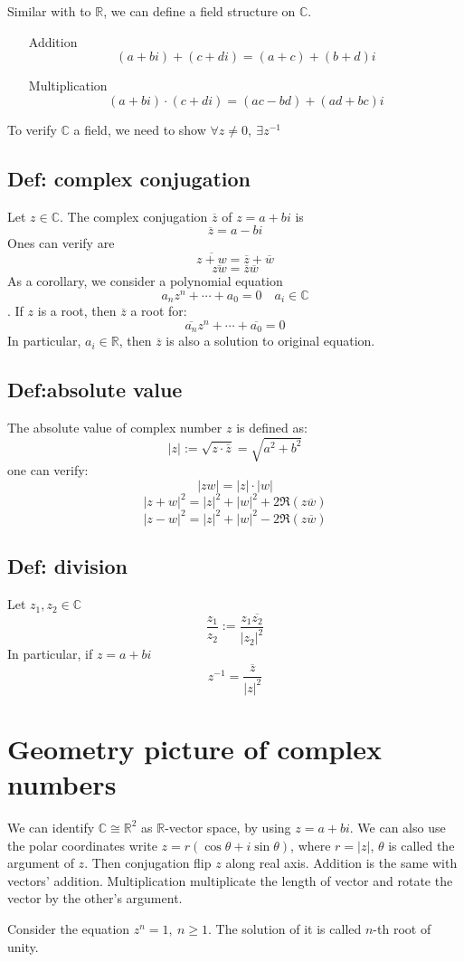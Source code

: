 \documentclass{book}
\newcommand{\abs}[1]{\left\lvert #1 \right\rvert}
\begin{document}
Similar with to $\mathbb R$, we can define a field structure on $\mathbb C$.\begin{itemize}
    \item[Addition]$$(a+bi)+(c+di)=(a+c)+(b+d)i$$
    \item[Multiplication]$$(a+bi)\cdot(c+di)=(ac-bd)+(ad+bc)i$$ 
\end{itemize}
To verify $\mathbb C$ a field, we need to show $\forall z\neq 0,\ \exists z^{-1}$
\section{Def: complex conjugation}Let $z\in \mathbb C$. The complex conjugation $\overline z$ of $z=a+bi$ is
$$\overline z=a-bi$$
Ones can verify are $$\overline{z+w}=\overline z+\overline w$$
$$\overline{zw}=\overline{z}\overline{w}$$
As a corollary, we consider a polynomial equation
$$a_nz^n+\cdots+a_0=0\quad a_i\in \mathbb{C}$$. If $z$ is a root, then $\overline z$ a root for:
$$\overline{a_n}z^n+\cdots+\overline{a_0}=0$$
In particular, $a_i\in\mathbb R$, then $\overline z$ is also a solution to original equation.
\section{Def:absolute value}
The absolute value of complex number $z$ is defined as:
$$\abs{z}:=\sqrt{z\cdot\overline z}=\sqrt{a^2+b^2}$$ one can verify:
$$\abs{zw}=\abs z\cdot\abs w$$
$$\abs{z+w}^2=\abs{z}^2+\abs{w}^2+2\Re(z\overline w)$$
$$\abs{z-w}^2=\abs{z}^2+\abs{w}^2-2\Re(z\overline w)$$
\section{Def: division}
Let $z_1,z_2\in \mathbb C$
$$\frac{z_1}{z_2}:=\frac{z_1\overline {z_2}}{\abs{z_2}^2}$$
In particular, if $z=a+bi$$$z^{-1}=\frac{\overline z}{\abs{z}^2}$$
\chapter{Geometry picture of complex numbers}
We can identify $\mathbb C\cong \mathbb R^2$ as $\mathbb R$-vector space, by using $z=a+bi$. We can also use the polar coordinates write $z=r(\cos\theta+i\sin\theta)$, where $r=\abs{z}$, $\theta$ is called the argument of $z$. Then conjugation flip $z$ along real axis. Addition is the same with vectors' addition. Multiplication multiplicate the length of vector and rotate the vector by the other's argument.

Consider the equation $z^n=1, \ n\geq 1$. The solution of it is called $n$-th root of unity.
\end{document}
